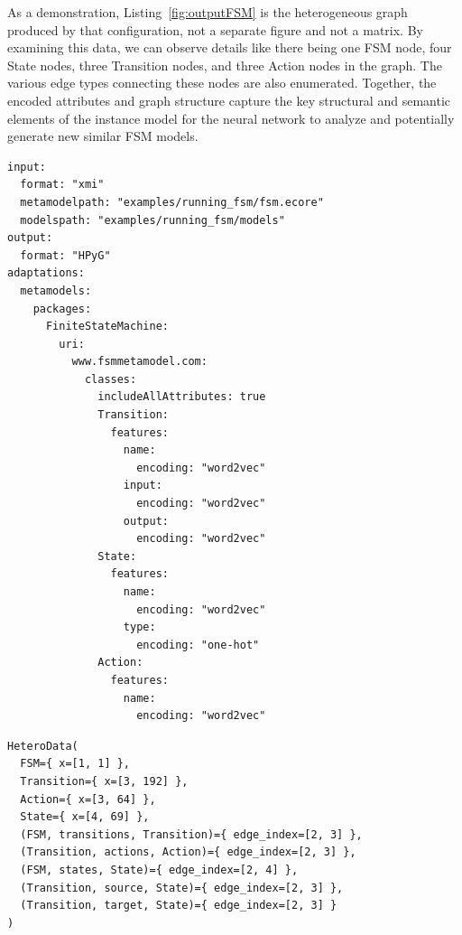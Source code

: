 \documentclass[journal,article,submit,moreauthors,technologies]{Definitions/mdpi}
\newcommand{\rev}[1]{#1}
\begin{document}
\rev{As a demonstration, Listing~\ref{fig:outputFSM} is the heterogeneous graph produced by that configuration, not a separate figure and not a matrix.} By examining this data, we can observe details like there being one FSM node, four State nodes, three Transition nodes, and three Action nodes in the graph. The various edge types connecting these nodes are also enumerated. Together, the encoded attributes and graph structure capture the key structural and semantic elements of the instance model for the neural network to analyze and potentially generate new similar FSM models.

\begin{program_}[H]
\footnotesize

\begin{verbatim}
input:
  format: "xmi"
  metamodelpath: "examples/running_fsm/fsm.ecore"
  modelspath: "examples/running_fsm/models"
output:
  format: "HPyG"
adaptations:
  metamodels:
    packages:
      FiniteStateMachine:
        uri:
          www.fsmmetamodel.com:
            classes:
              includeAllAttributes: true
              Transition:
                features:
                  name:
                    encoding: "word2vec"
                  input:
                    encoding: "word2vec"
                  output:
                    encoding: "word2vec"
              State:
                features:
                  name:
                    encoding: "word2vec"
                  type:
                    encoding: "one-hot"
              Action:
                features:
                  name:
                    encoding: "word2vec"
\end{verbatim}
\caption{\rev{Attribute encoding for the running example. The class is \texttt{Transition}, and every \texttt{encoding} key has its colon.}}
\label{code:YamlFSMattributes}
\end{program_}


\begin{program_}[H]
\footnotesize
\begin{verbatim}
HeteroData(
  FSM={ x=[1, 1] },
  Transition={ x=[3, 192] },
  Action={ x=[3, 64] },
  State={ x=[4, 69] },
  (FSM, transitions, Transition)={ edge_index=[2, 3] },
  (Transition, actions, Action)={ edge_index=[2, 3] },
  (FSM, states, State)={ edge_index=[2, 4] },
  (Transition, source, State)={ edge_index=[2, 3] },
  (Transition, target, State)={ edge_index=[2, 3] }
)
\end{verbatim}
\caption{\rev{The heterogeneous graph produced by running Listing~\ref{code:YamlFSMattributes}. Each \texttt{x} shape is (number of nodes, feature width). The State width 69 is a 64-dimensional name vector, the raw timeout and a 4-dimensional one-hot. For state1, \texttt{type=Initial} encodes as $[0, 1, 0, 0]$ (vocabulary Final, Initial, Intermediate, plus an unknown bin) and timeout is the raw value 1. The name coordinates stay at the untrained initialisation of Section~\ref{sec:avalues} and are not printed.}}
\label{fig:outputFSM}
\end{program_}
\end{document}
